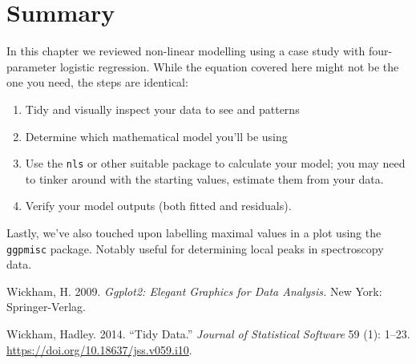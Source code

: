\documentclass[
]{book}
\providecommand{\tightlist}{%
  \setlength{\itemsep}{0pt}\setlength{\parskip}{0pt}}
\newlength{\cslhangindent}
\newlength{\cslentryspacingunit} %
\newenvironment{CSLReferences}[2] %
 {%
  \setlength{\parindent}{0pt}
  \ifodd #1
  \let\oldpar\par
  \def\par{\hangindent=\cslhangindent\oldpar}
  \fi
  \setlength{\parskip}{#2\cslentryspacingunit}
 }%
 {}
\begin{document}
\hypertarget{summary-6}{%
\section{Summary}\label{summary-6}}

In this chapter we reviewed non-linear modelling using a case study with four-parameter logistic regression. While the equation covered here might not be the one you need, the steps are identical:

\begin{enumerate}
\def\labelenumi{\arabic{enumi}.}
\tightlist
\item
  Tidy and visually inspect your data to see and patterns
\item
  Determine which mathematical model you'll be using
\item
  Use the \texttt{nls} or other suitable package to calculate your model; you may need to tinker around with the starting values, estimate them from your data.
\item
  Verify your model outputs (both fitted and residuals).
\end{enumerate}

Lastly, we've also touched upon labelling maximal values in a plot using the \texttt{ggpmisc} package. Notably useful for determining local peaks in spectroscopy data.

\hypertarget{refs}{}
\begin{CSLReferences}{1}{0}
\leavevmode{}%
Wickham, H. 2009. \emph{Ggplot2: Elegant Graphics for Data Analysis.} New York: Springer-Verlag.

\leavevmode{}%
Wickham, Hadley. 2014. {``Tidy Data.''} \emph{Journal of Statistical Software} 59 (1): 1--23. \url{https://doi.org/10.18637/jss.v059.i10}.

\end{CSLReferences}
\end{document}
